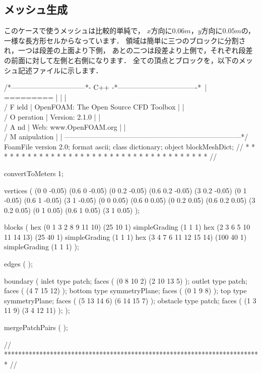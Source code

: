 \subsection{メッシュ生成}
\label{ssec:3.3.2}
このケースで使うメッシュは比較的単純で，
$x$方向に$0.06 \unit{m}$，$y$方向に$0.05 \unit{m}$の，
一様な長方形セルからなっています．
領域は簡単に三つのブロックに分割され，一つは段差の上面より下側，
あとの二つは段差より上側で，それぞれ段差の前面に対して左側と右側になります．
全ての頂点とブロックを，以下のメッシュ記述ファイルに示します．
\begin{OFverbatim}
/*--------------------------------*- C++ -*----------------------------------*\
| =========                 |                                                 |
| \\      /  F ield         | OpenFOAM: The Open Source CFD Toolbox           |
|  \\    /   O peration     | Version:  2.1.0                                 |
|   \\  /    A nd           | Web:      www.OpenFOAM.org                      |
|    \\/     M anipulation  |                                                 |
\*---------------------------------------------------------------------------*/
FoamFile
{
    version     2.0;
    format      ascii;
    class       dictionary;
    object      blockMeshDict;
}
// * * * * * * * * * * * * * * * * * * * * * * * * * * * * * * * * * * * * * //

convertToMeters 1;

vertices        
(
    (0 0 -0.05)
    (0.6 0 -0.05)
    (0 0.2 -0.05)
    (0.6 0.2 -0.05)
    (3 0.2 -0.05)
    (0 1 -0.05)
    (0.6 1 -0.05)
    (3 1 -0.05)
    (0 0 0.05)
    (0.6 0 0.05)
    (0 0.2 0.05)
    (0.6 0.2 0.05)
    (3 0.2 0.05)
    (0 1 0.05)
    (0.6 1 0.05)
    (3 1 0.05)
);

blocks          
(
    hex (0 1 3 2 8 9 11 10) (25 10 1) simpleGrading (1 1 1)
    hex (2 3 6 5 10 11 14 13) (25 40 1) simpleGrading (1 1 1)
    hex (3 4 7 6 11 12 15 14) (100 40 1) simpleGrading (1 1 1)
);

edges           
(
);

boundary
(
    inlet
    {
        type patch;
        faces
        (
            (0 8 10 2)
            (2 10 13 5)
        );
    }
    outlet
    {
        type patch;
        faces
        (
            (4 7 15 12)
        );
    }
    bottom
    {
        type symmetryPlane;
        faces
        (
            (0 1 9 8)
        );
    }
    top
    {
        type symmetryPlane;
        faces
        (
            (5 13 14 6)
            (6 14 15 7)
        );
    }
    obstacle
    {
        type patch;
        faces
        (
            (1 3 11 9)
            (3 4 12 11)
        );
    }
);

mergePatchPairs
(
);

// ************************************************************************* //
\end{OFverbatim}


